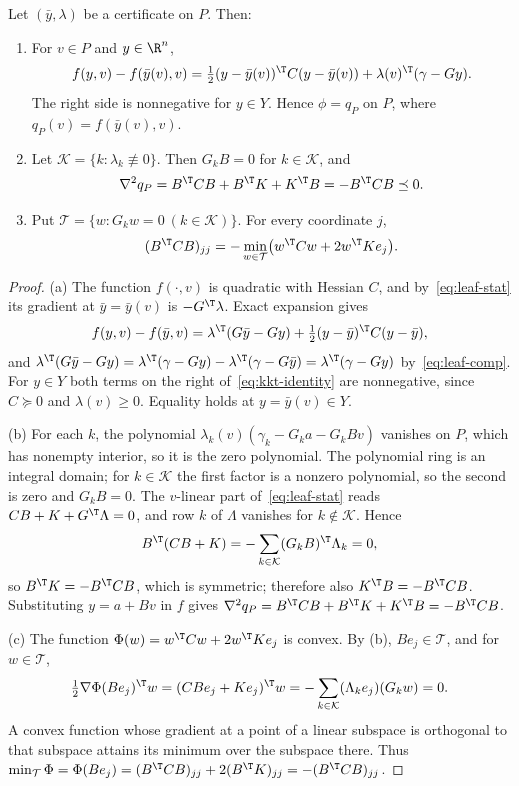 \begin{lemma}\label{lem:leaf}
Let $(\bar y,\lambda)$ be a certificate on $P$. Then:
\begin{enumerate}
\item[(a)] For $v\in P$ and $y\in\R^{n}$,
\begin{equation}\label{eq:kkt-identity}
f(y,v)-f(\bar y(v),v)=\tfrac12(y-\bar y(v))^{\T}C(y-\bar y(v))
+\lambda(v)^{\T}(\gamma-Gy).
\end{equation}
The right side is nonnegative for $y\in Y$. Hence $\phi=q_P$ on $P$, where
$q_P(v)=f(\bar y(v),v)$.
\item[(b)] Let $\mathcal K=\{k:\lambda_k\not\equiv0\}$. Then $G_kB=0$ for
$k\in\mathcal K$, and
\[
\nabla^2q_P=B^{\T}CB+B^{\T}K+K^{\T}B=-B^{\T}CB\preceq0.
\]
\item[(c)] Put $\mathcal T=\{w:G_kw=0\ (k\in\mathcal K)\}$. For every
coordinate $j$,
\begin{equation}\label{eq:cv-energy}
(B^{\T}CB)_{jj}
=-\min_{w\in\mathcal T}\bigl(w^{\T}Cw+2w^{\T}Ke_j\bigr).
\end{equation}
\end{enumerate}
\end{lemma}

\begin{proof}
(a) The function $f(\cdot,v)$ is quadratic with Hessian $C$, and
by~\eqref{eq:leaf-stat} its gradient at $\bar y=\bar y(v)$ is
$-G^{\T}\lambda$. Exact expansion gives
\[
f(y,v)-f(\bar y,v)=\lambda^{\T}(G\bar y-Gy)+\tfrac12(y-\bar y)^{\T}C(y-\bar y),
\]
and $\lambda^{\T}(G\bar y-Gy)=\lambda^{\T}(\gamma-Gy)-\lambda^{\T}(\gamma-G\bar y)
=\lambda^{\T}(\gamma-Gy)$ by~\eqref{eq:leaf-comp}. For $y\in Y$ both
terms on the right of~\eqref{eq:kkt-identity} are nonnegative, since
$C\succeq0$ and $\lambda(v)\ge0$. Equality holds at $y=\bar y(v)\in Y$.

(b) For each $k$, the polynomial $\lambda_k(v)(\gamma_k-G_k a-G_kBv)$ vanishes
on $P$, which has nonempty interior, so it is the zero polynomial. The
polynomial ring is an integral domain; for $k\in\mathcal K$ the first factor
is a nonzero polynomial, so the second is zero and $G_kB=0$. The $v$-linear
part of~\eqref{eq:leaf-stat} reads $CB+K+G^{\T}\Lambda=0$, and row $k$
of $\Lambda$ vanishes for $k\notin\mathcal K$. Hence
\[
B^{\T}(CB+K)=-\sum_{k\in\mathcal K}(G_kB)^{\T}\Lambda_k=0,
\]
so $B^{\T}K=-B^{\T}CB$, which is symmetric; therefore also
$K^{\T}B=-B^{\T}CB$. Substituting $y=a+Bv$ in $f$ gives
$\nabla^2q_P=B^{\T}CB+B^{\T}K+K^{\T}B=-B^{\T}CB$.

(c) The function $\Phi(w)=w^{\T}Cw+2w^{\T}Ke_j$ is convex. By (b),
$Be_j\in\mathcal T$, and for $w\in\mathcal T$,
\[
\tfrac12\nabla\Phi(Be_j)^{\T}w=(CBe_j+Ke_j)^{\T}w
=-\sum_{k\in\mathcal K}(\Lambda_ke_j)(G_kw)=0.
\]
A convex function whose gradient at a point of a linear subspace is
orthogonal to that subspace attains its minimum over the subspace there. Thus
$\min_{\mathcal T}\Phi=\Phi(Be_j)=(B^{\T}CB)_{jj}+2(B^{\T}K)_{jj}
=-(B^{\T}CB)_{jj}$.
\end{proof}

